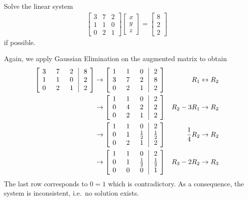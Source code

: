 \begin{exmp}
\label{exmp:nosol}
Solve the linear system
\begin{align*}
\begin{bmatrix}
3 & 7 & 2 \\
1 & 1 & 0 \\
0 & 2 & 1 
\end{bmatrix}
\begin{bmatrix}
x \\
y \\
z
\end{bmatrix}
=
\begin{bmatrix}
8 \\
2 \\
2
\end{bmatrix}   
\end{align*}
if possible.
\end{exmp}
\begin{solution} Again, we apply Gaussian Elimination on the augmented matrix to obtain
\begin{align*}
\left[\begin{array}{@{\,}wc{10pt}wc{10pt}wc{10pt}|wc{10pt}@{\,}}
3 & 7 & 2 & 8 \\
1 & 1 & 0 & 2 \\
0 & 2 & 1 & 2
\end{array}\right] 
& \to 
\left[\begin{array}{@{\,}wc{10pt}wc{10pt}wc{10pt}|wc{10pt}@{\,}}
1 & 1 & 0 & 2 \\
3 & 7 & 2 & 8 \\
0 & 2 & 1 & 2
\end{array}\right] 
& R_1 \leftrightarrow R_2 \\
& \to 
\left[\begin{array}{@{\,}wc{10pt}wc{10pt}wc{10pt}|wc{10pt}@{\,}}
1 & 1 & 0 & 2 \\
0 & 4 & 2 & 2 \\
0 & 2 & 1 & 2
\end{array}\right] 
& R_2-3R_1 \to R_2 \\
& \to 
\left[\begin{array}{@{\,}wc{10pt}wc{10pt}wc{10pt}|wc{10pt}@{\,}}
1 & 1 & 0 & 2 \\
0 & 1 & \frac{1}{2} & \frac{1}{2} \\
0 & 2 & 1 & 2
\end{array}\right] 
& \frac{1}{4}R_2 \to R_2 \\
& \to 
\left[\begin{array}{@{\,}wc{10pt}wc{10pt}wc{10pt}|wc{10pt}@{\,}}
1 & 1 & 0 & 2 \\
0 & 1 & \frac{1}{2} & \frac{1}{2} \\
0 & 0 & 0 & 1
\end{array}\right] 
& R_3 - 2R_2 \to R_3
\end{align*}
The last row corresponds to $0 = 1$ which is contradictory. As a consequence, the system is inconsistent, i.e.\ no solution exists.
\end{solution}

